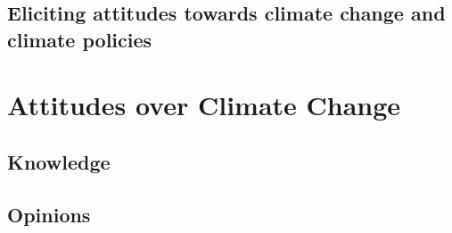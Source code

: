 \documentclass[11pt]{article}
\begin{document}

    \subsection{Eliciting attitudes towards climate change and climate policies}
    



\section{Attitudes over Climate Change}


    \subsection{Knowledge}



    \subsection{Opinions}

\end{document}
